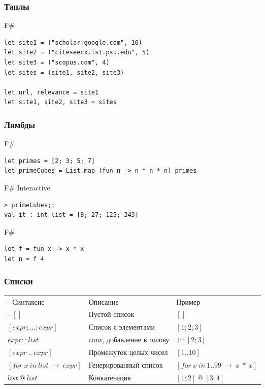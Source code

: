 \documentclass[xetex,mathserif,serif]{beamer}
\begin{document}
	\begin{frame}[fragile]
		\frametitle{Таплы}
		\begin{exampleblock}{F\#}
			\begin{lstlisting}
let site1 = ("scholar.google.com", 10)
let site2 = ("citeseerx.ist.psu.edu", 5)
let site3 = ("scopus.com", 4)
let sites = (site1, site2, site3)

let url, relevance = site1
let site1, site2, site3 = sites
            \end{lstlisting}
		\end{exampleblock}
\end{frame}

	\begin{frame}[fragile]
		\frametitle{Лямбды}
		\begin{exampleblock}{F\#}
			\begin{lstlisting}
let primes = [2; 3; 5; 7]
let primeCubes = List.map (fun n -> n * n * n) primes
            \end{lstlisting}
		\end{exampleblock}
		\begin{alertblock}{F\# Interactive}
			\begin{lstlisting}
> primeCubes;;
val it : int list = [8; 27; 125; 343]
            \end{lstlisting}
		\end{alertblock}
		\begin{exampleblock}{F\#}
			\begin{lstlisting}
let f = fun x -> x * x
let n = f 4
            \end{lstlisting}
		\end{exampleblock}
\end{frame}

	\begin{frame}
		\frametitle{Списки}
		\begin{small}
			\begin{tabu} {| X[0.9 l p] | X[1 l p] | X[1 l p] |}
				\tabucline-
				Синтаксис                               & Описание                  & Пример                             \\
				\tabucline-
				\everyrow{\tabucline-}
				$[]$                                    & Пустой список             & $[]$                               \\
				$[expr; ...; expr]$                     & Список с элементами       & $[1; 2; 3]$                        \\
				$expr :: list$                          & cons, добавление в голову & $1 :: [2; 3]$                      \\
				$[expr\ ..\ expr]$                      & Промежуток целых чисел    & $[1 .. 10]$                        \\
				$[for\ x\ in\ list\ \rightarrow\ expr]$ & Генерированный список     & $[for\ x\ in\ 1..99\ \rightarrow\ x\ *\ x]$ \\					
				$list\ @\ list$                         & Конкатенация              & $[1; 2]\ @\ [3; 4]$                \\					
			\end{tabu}
		\end{small}
	\end{frame}
\end{document}

